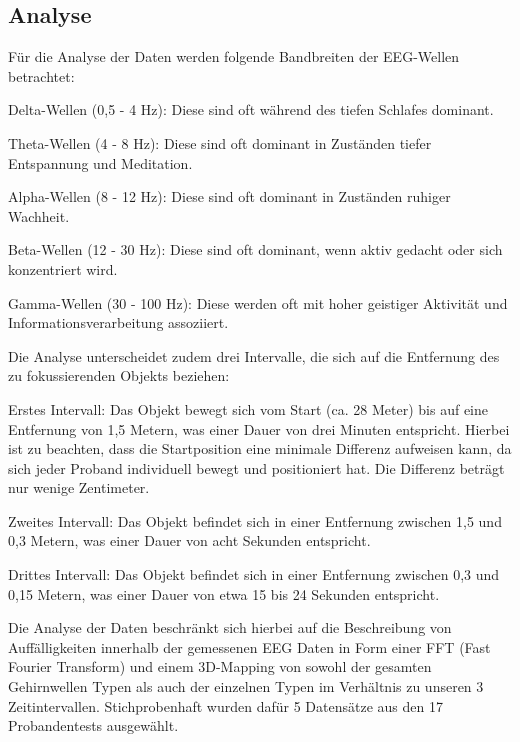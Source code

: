 \documentclass[conference]{IEEEtran}
\begin{document}
\subsection{Analyse}
Für die Analyse der Daten werden folgende Bandbreiten der EEG-Wellen betrachtet:
\begin{myitemize}
    \item Delta-Wellen (0,5 - 4 Hz): Diese sind oft während des tiefen Schlafes dominant.
    \item Theta-Wellen (4 - 8 Hz): Diese sind oft dominant in Zuständen tiefer Entspannung und Meditation.
    \item Alpha-Wellen (8 - 12 Hz): Diese sind oft dominant in Zuständen ruhiger Wachheit.
    \item Beta-Wellen (12 - 30 Hz): Diese sind oft dominant, wenn aktiv gedacht oder sich konzentriert wird.
    \item Gamma-Wellen (30 - 100 Hz): Diese werden oft mit hoher geistiger Aktivität und Informationsverarbeitung assoziiert.
\end{myitemize}

Die Analyse unterscheidet zudem drei Intervalle, die sich auf die Entfernung des zu fokussierenden Objekts beziehen:

\begin{myitemize}
    \item Erstes Intervall: Das Objekt bewegt sich vom Start (ca. 28 Meter) bis auf eine Entfernung von 1,5 Metern, was einer Dauer von drei Minuten entspricht. Hierbei ist zu beachten, dass die Startposition eine minimale Differenz aufweisen kann, da sich jeder Proband individuell bewegt und positioniert hat. Die Differenz beträgt nur wenige Zentimeter.
    \item Zweites Intervall: Das Objekt befindet sich in einer Entfernung zwischen 1,5 und 0,3 Metern, was einer Dauer von acht Sekunden entspricht.
    \item Drittes Intervall: Das Objekt befindet sich in einer Entfernung zwischen 0,3 und 0,15 Metern, was einer Dauer von etwa 15 bis 24 Sekunden entspricht.
\end{myitemize}

Die Analyse der Daten beschränkt sich hierbei auf die Beschreibung von Auffälligkeiten innerhalb der gemessenen EEG Daten in Form einer FFT (Fast Fourier Transform) und einem 3D-Mapping von sowohl der gesamten Gehirnwellen Typen als auch der einzelnen Typen im Verhältnis zu unseren 3 Zeitintervallen. Stichprobenhaft wurden dafür 5 Datensätze aus den 17 Probandentests ausgewählt. 
\end{document}

